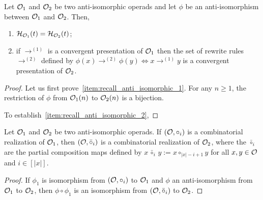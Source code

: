 \begin{Proposition} \label{prop:recall_anti_isomorphic}
  Let $\mathcal{O}_1$ and $\mathcal{O}_2$ be two anti-isomorphic operads and let
  $\phi$ be an anti-isomorphism between $\mathcal{O}_1$ and $\mathcal{O}_2$. Then,
    \begin{enumerate}[label={(\it\roman*)}]
        \item \label{item:recall_anti_isomorphic_1}
        $\mathcal{H}_{\mathcal{O}_1}(t) = \mathcal{H}_{\mathcal{O}_2}(t)$;
        \item \label{item:recall_anti_isomorphic_2}
        if $\rightarrow^{(1)}$ is a convergent presentation of
        $\mathcal{O}_1$
        then the set of rewrite rules $\rightarrow^{(2)}$ defined by
        \begin{math}
          \phi(x) \rightarrow^{(2)} \phi(y) \iff x \rightarrow^{(1)} y
        \end{math}
        is a convergent presentation of $\mathcal{O}_2$.
    \end{enumerate}
\end{Proposition}
\begin{proof}
    Let us first prove~\ref{item:recall_anti_isomorphic_1}. For any
    $n \geq 1$, the restriction of $\phi$ from $\mathcal{O}_1(n)$ to
    $\mathcal{O}_2(n)$ is a bijection.
    \smallbreak

    To establish~\ref{item:recall_anti_isomorphic_2},
\end{proof}
\medbreak

\begin{Proposition} \label{prop:realization_anti_isomorphic}
    Let $\mathcal{O}_1$ and $\mathcal{O}_2$ be two anti-isomorphic operads. If
    $\left(\mathcal{O}, \circ_i\right)$ is a combinatorial realization of
    $\mathcal{O}_1$, then
    \begin{math}
        \left(\mathcal{O}, \bar{\circ}_i\right)
    \end{math}
    is a combinatorial realization of $\mathcal{O}_2$, where the
    $\bar{\circ}_i$ are the partial composition maps defined by
    \begin{math}
        x \, \bar{\circ}_i \, y := x \circ_{|x| - i + 1} y
    \end{math}
    for all $x, y \in \mathcal{O}$ and $i \in [|x|]$.
\end{Proposition}
\begin{proof}
  If $\phi_1$ is isomorphism from $(\mathcal{O}, \circ_i)$ to
  $\mathcal{O}_1$ and $\phi$ an anti-isomorphism from $\mathcal{O}_1$ to $\mathcal{O}_2$,
  then $\phi \circ \phi_1$ is an isomorphism from
  $(\mathcal{O}, \bar{\circ}_i)$ to $\mathcal{O}_2$.
\end{proof}
\medbreak

